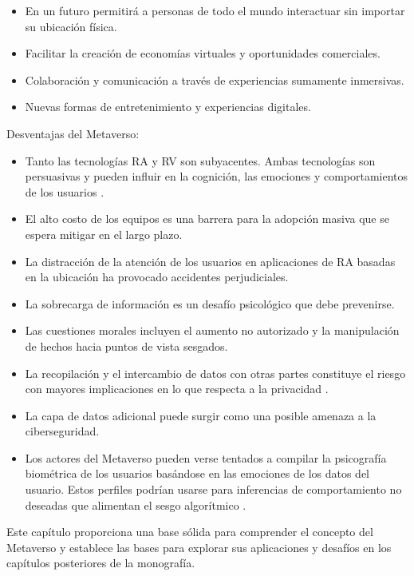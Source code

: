 \documentclass[a4paper,10pt]{article}
\begin{document}
{\begin{itemize}
	 		\item En un futuro permitirá a personas de todo el mundo interactuar sin importar su ubicación física.
	 		\item Facilitar la creación de economías virtuales y oportunidades comerciales.
	 		\item  Colaboración y comunicación a través de experiencias sumamente inmersivas.
	 		\item Nuevas formas de entretenimiento y experiencias digitales.
	 	\end{itemize}
	 	Desventajas del Metaverso:
	 	\begin{itemize}
	 		\item Tanto las tecnologías RA y RV son subyacentes. Ambas tecnologías son persuasivas y pueden influir en la cognición, las emociones y comportamientos de los usuarios \parencite{slater2020ethics}.
	 		\item El alto costo de los equipos es una barrera para la adopción masiva que se espera mitigar en el largo plazo.
	 		\item La distracción de la atención de los usuarios en aplicaciones de RA basadas en la ubicación ha provocado accidentes perjudiciales.
	 		\item La sobrecarga de información es un desafío psicológico que debe prevenirse.
	 		\item Las cuestiones morales incluyen el aumento no autorizado y la manipulación de hechos hacia puntos de vista sesgados.
	 		\item La recopilación y el intercambio de datos con otras partes constituye el riesgo con mayores implicaciones en lo que respecta a la privacidad \parencite{christopoulos2021arlean}.
	 		\item La capa de datos adicional puede surgir como una posible amenaza a la ciberseguridad.
	 		\item Los actores del Metaverso pueden verse tentados a compilar la psicografía biométrica de los usuarios basándose en las emociones de los datos del usuario. Estos perfiles podrían usarse para inferencias de comportamiento no deseadas que alimentan el sesgo algorítmico \parencite{heller2020watching}.
	 	\end{itemize}
	   Este capítulo proporciona una base sólida para comprender el concepto del Metaverso y establece las bases para explorar sus aplicaciones y desafíos en los capítulos posteriores de la monografía.}
\end{document}
